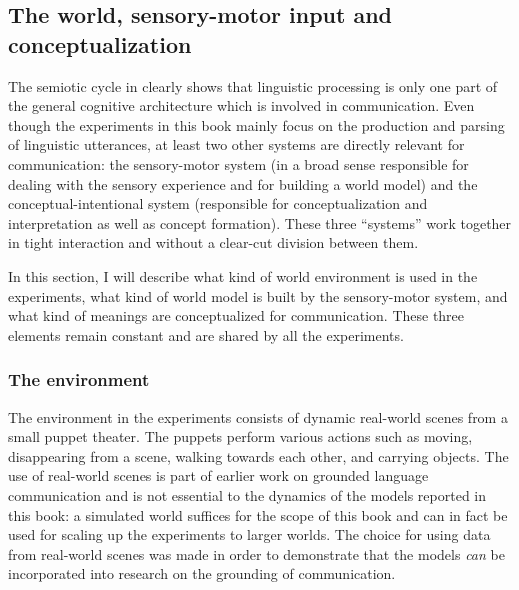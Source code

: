 \subsection{The world, sensory-motor input and conceptualization}
\label{s:world}



The semiotic cycle in  clearly shows that linguistic processing is only one part of the general cognitive architecture which is involved in communication. Even though the experiments in this book mainly focus on the production and parsing of linguistic utterances, at least two other systems are directly relevant for communication: the sensory-motor system (in a broad sense responsible for dealing with the sensory experience and for building a world model) and the conceptual-intentional system (responsible for conceptualization and interpretation as well as concept formation). These three ``systems'' work together in tight interaction and without a clear-cut division between them.

In this section, I will describe what kind of world environment is used in the experiments, what kind of world model is built by the sensory-motor system, and what kind of meanings are conceptualized for communication. These three elements remain constant and are shared by all the experiments.


\subsubsection{The environment}
 The environment in the experiments consists of dynamic real-world scenes from a small puppet theater. The puppets perform various actions such as moving, disappearing from a scene, walking towards each other, and carrying objects. The use of real-world scenes is part of earlier work on grounded language communication \citep{steels02simulating, steels03shared} and is not essential to the dynamics of the models reported in this book: a simulated world suffices for the scope of this book and can in fact be used for scaling up the experiments to larger worlds. The choice for using data from real-world scenes was made in order to demonstrate that the models {\em can} be incorporated into research on the grounding of communication.

